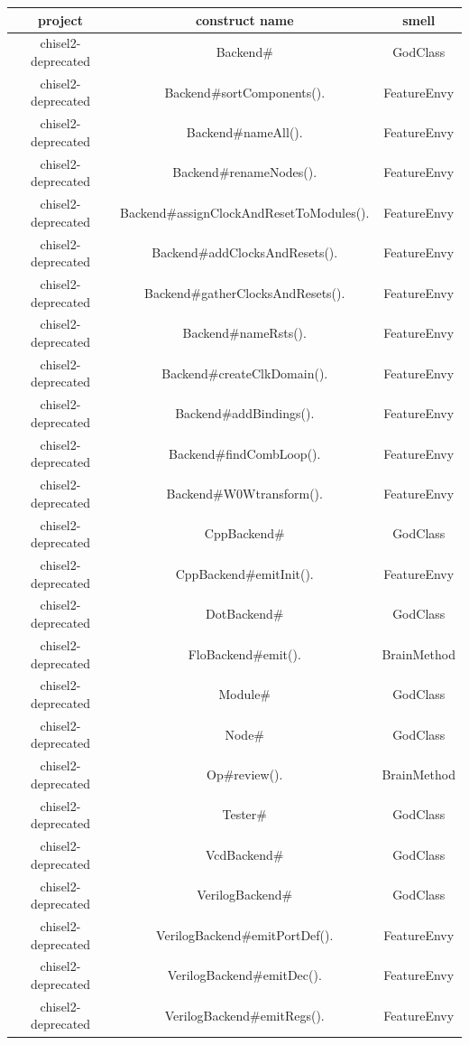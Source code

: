 \documentclass[onecolumn]{article}
\begin{document}
 \newpage
 \begin{tabular}{|c c c|} 
 \hline
 project & construct name & smell \\ [0.5ex] 
 \hline\hline
chisel2-deprecated & Backend\# & GodClass \\
chisel2-deprecated & Backend\#sortComponents(). & FeatureEnvy \\
chisel2-deprecated & Backend\#nameAll(). & FeatureEnvy \\
chisel2-deprecated & Backend\#renameNodes(). & FeatureEnvy \\
chisel2-deprecated & Backend\#assignClockAndResetToModules(). & FeatureEnvy \\
chisel2-deprecated & Backend\#addClocksAndResets(). & FeatureEnvy \\
chisel2-deprecated & Backend\#gatherClocksAndResets(). & FeatureEnvy \\
chisel2-deprecated & Backend\#nameRsts(). & FeatureEnvy \\
chisel2-deprecated & Backend\#createClkDomain(). & FeatureEnvy \\
chisel2-deprecated & Backend\#addBindings(). & FeatureEnvy \\
chisel2-deprecated & Backend\#findCombLoop(). & FeatureEnvy \\
chisel2-deprecated & Backend\#W0Wtransform(). & FeatureEnvy \\
chisel2-deprecated & CppBackend\# & GodClass \\
chisel2-deprecated & CppBackend\#emitInit(). & FeatureEnvy \\
chisel2-deprecated & DotBackend\# & GodClass \\
chisel2-deprecated & FloBackend\#emit(). & BrainMethod \\
chisel2-deprecated & Module\# & GodClass \\
chisel2-deprecated & Node\# & GodClass \\
chisel2-deprecated & Op\#review(). & BrainMethod \\
chisel2-deprecated & Tester\# & GodClass \\
chisel2-deprecated & VcdBackend\# & GodClass \\
chisel2-deprecated & VerilogBackend\# & GodClass \\
chisel2-deprecated & VerilogBackend\#emitPortDef(). & FeatureEnvy \\
chisel2-deprecated & VerilogBackend\#emitDec(). & FeatureEnvy \\
chisel2-deprecated & VerilogBackend\#emitRegs(). & FeatureEnvy \\

\end{tabular}
\end{document}
